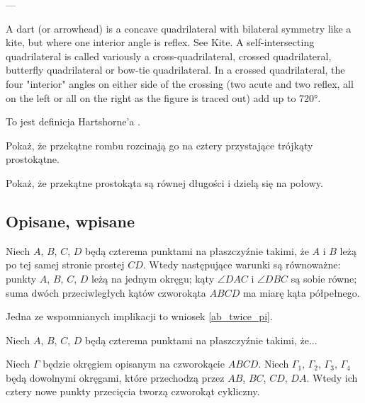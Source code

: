 ---

A dart (or arrowhead) is a concave quadrilateral with bilateral symmetry like a kite, but where one interior angle is reflex. See Kite.
A self-intersecting quadrilateral is called variously a cross-quadrilateral, crossed quadrilateral, butterfly quadrilateral or bow-tie quadrilateral. In a crossed quadrilateral, the four "interior" angles on either side of the crossing (two acute and two reflex, all on the left or all on the right as the figure is traced out) add up to 720°.


To jest definicja Hartshorne'a \cite[s. 80]{hartshorne2000}.

Pokaż, że przekątne rombu rozcinają go na cztery przystające trójkąty prostokątne. %

Pokaż, że przekątne prostokąta są równej długości i dzielą się na połowy. %

\subsection{Opisane, wpisane}
\begin{proposition}
	\label{prp_incircle}
	Niech $A$, $B$, $C$, $D$ będą czterema punktami na płaszczyźnie takimi, że $A$ i $B$ leżą po tej samej stronie prostej $CD$.
	Wtedy następujące warunki są równoważne: punkty $A$, $B$, $C$, $D$ leżą na jednym okręgu; kąty $\angle DAC$ i $\angle DBC$ są sobie równe; suma dwóch przeciwległych kątów czworokąta $ABCD$ ma miarę kąta półpełnego.
\end{proposition}

Jedna ze wspomnianych implikacji to wniosek \ref{ab_twice_pi}.

\begin{proposition}
	\label{prp_excircle}
	Niech $A$, $B$, $C$, $D$ będą czterema punktami na płaszczyźnie takimi, że...
\end{proposition}

\begin{proposition}
	Niech $\Gamma$ będzie okręgiem opisanym na czworokącie $ABCD$.
	Niech $\Gamma_1$, $\Gamma_2$, $\Gamma_3$, $\Gamma_4$ będą dowolnymi okręgami, które przechodzą przez $AB$, $BC$, $CD$, $DA$.
	Wtedy ich cztery nowe punkty przecięcia tworzą czworokąt cykliczny.
\end{proposition}

